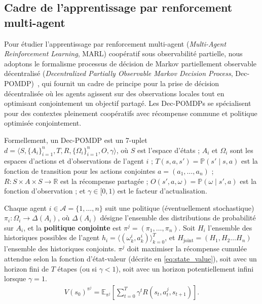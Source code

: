 \documentclass[final]{jfsma}
\theoremstyle{plain}
\theoremstyle{definition}
\theoremstyle{remark}
\begin{document}
\subsection{Cadre de l'apprentissage par renforcement multi-agent}
\label{sec:decpomdp}

Pour étudier l'apprentissage par renforcement multi-agent (\emph{Multi-Agent Reinforcement Learning}, MARL) coopératif sous observabilité partielle, nous adoptons le formalisme processus de décision de Markov partiellement observable décentralisé (\emph{Decentralized Partially Observable Markov Decision Process}, Dec-POMDP)~\cite{Oliehoek2016}, qui fournit un cadre de principe pour la prise de décision décentralisée où les agents agissent sur des observations locales tout en optimisant conjointement un objectif partagé.
Les Dec-POMDPs se spécialisent pour des contextes pleinement coopératifs avec récompense commune et politique optimisée conjointement.

Formellement, un Dec-POMDP est un 7-uplet
$d = \langle S, \{A_i\}_{i=1}^n, T, R, \{\Omega_i\}_{i=1}^n, O, \gamma \rangle$,
où $S$ est l'espace d'états ;
$A_i$ et $\Omega_i$ sont les espaces d'actions et d'observations de l'agent $i$ ;
$T(s,a,s') = \mathbb{P}(s' \mid s,a)$ est la fonction de transition pour les actions conjointes $a = (a_1,\dots,a_n)$ ;
$R : S \times A \times S \rightarrow \mathbb{R}$ est la récompense partagée ;
$O(s',a,\omega) = \mathbb{P}(\omega \mid s',a)$ est la fonction d'observation ;
et $\gamma \in [0,1)$ est le facteur d'actualisation.

Chaque agent $i \in \mathcal{A} = \{1,\dots,n\}$ suit une politique (éventuellement stochastique)
$\pi_i : \Omega_i \rightarrow \Delta(A_i)$, où $\Delta(A_i)$ désigne l'ensemble des distributions de probabilité sur $A_i$,
et la \textbf{politique conjointe} est
$\pi^j = (\pi_1,\dots,\pi_n)$.
Soit $H_i$ l'ensemble des historiques possibles de l'agent
$h_i = \langle (\omega_k^i, a_k^i) \rangle_{k=0}^{T}$,
et $H_{\text{joint}} = (H_1, H_2 \dots H_n)$ l'ensemble des historiques conjoints.
$\pi^j$ doit maximiser la récompense cumulée attendue selon la fonction d'état-valeur (décrite en \autoref{eq:state_value}), soit avec un horizon fini de $T$ étapes (ou si $\gamma < 1$), soit avec un horizon potentiellement infini lorsque $\gamma = 1$.
\begin{align}
  \label{eq:state_value}
  V(s_0)^{\pi^j} = \mathbb{E}_{\pi^j}\!\left[ \sum_{t=0}^{T} \gamma^t R(s_t, a^j_t, s_{t+1}) \right].
\end{align}
\end{document}
